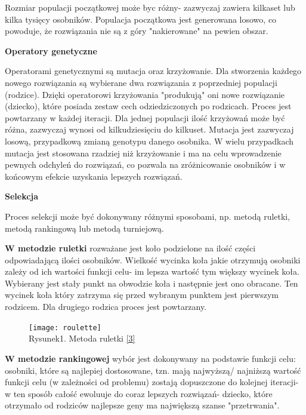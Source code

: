 \documentclass[a4paper, twoside, 12pt, justified]{article}
\begin{document}
	Rozmiar populacji początkowej może byc różny- zazwyczaj zawiera kilkaset lub kilka tysięcy osobników. Populacja początkowa jest generowana losowo, co powoduje, że rozwiązania nie są z góry "nakierowane" na pewien obszar.
	
	\begin{center}
		\textbf{Operatory genetyczne}
	\end{center}  
	
	Operatorami genetycznymi są mutacja oraz krzyżowanie. Dla stworzenia każdego nowego rozwiązania są wybierane dwa rozwiązania z poprzedniej populacji (rodzice). Dzięki operatorowi krzyżowania "produkują" oni nowe rozwiązanie (dziecko), które posiada zestaw cech odziedziczonych po rodzicach. Proces jest powtarzany w każdej iteracji. Dla jednej populacji ilość krzyżowań może być różna, zazwyczaj wynosi od kilkudziesięciu do kilkuset. Mutacja jest zazwyczaj losową, przypadkową zmianą genotypu danego osobnika. W wielu przypadkach mutacja jest stosowana rzadziej niż krzyżowanie i ma na celu wprowadzenie pewnych odchyleń do rozwiązań, co pozwala na zróżnicowanie osobników i w końcowym efekcie uzyskania lepszych rozwiązań.

	
	\begin{center}
		\textbf{Selekcja}
	\end{center}    
	
	Proces selekcji może być dokonywany różnymi sposobami, np. metodą ruletki, metodą rankingową lub metodą turniejową. 
	
	\textbf{W metodzie ruletki} rozważane jest koło podzielone na ilość części odpowiadającą ilości osobników. Wielkość wycinka koła jakie otrzymują osobniki zależy od ich wartości funkcji celu- im lepsza wartość tym większy wycinek koła. Wybierany jest stały punkt na obwodzie koła i następnie jest ono obracane. Ten wycinek koła który zatrzyma się przed wybranym punktem jest pierwszym rodzicem. Dla drugiego rodzica proces jest powtarzany.\\ 
	
	\begin{figure}[h]
		\texttt{[image: roulette]}
		\centering
		\\
		{Rysunek1. Metoda ruletki \hyperlink{selection}{[3]} } 
	\end{figure}
	
	\textbf{W metodzie rankingowej} wybór jest dokonywany na podstawie funkcji celu: osobniki, które są najlepiej dostosowane, tzn. mają najwyższą/ najniższą wartość funkcji celu (w zależności od problemu) zostają dopuszczone do kolejnej iteracji- w ten sposób całość ewoluuje do coraz lepszych rozwiązań- dziecko, które otrzymało od rodziców najlepsze geny ma największą szanse "przetrwania".\\
	
\end{document}
